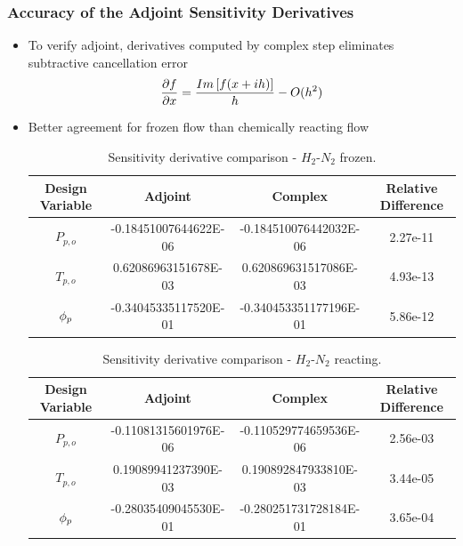 \documentclass{beamer}
\begin{document}
\begin{frame}
  \frametitle{Accuracy of the Adjoint Sensitivity Derivatives}
  \begin{itemize}
    \item To verify adjoint, derivatives computed by complex step eliminates
      subtractive cancellation error
    \[
      \frac{\partial f}{\partial x} = \frac{Im\left[ f(x + ih) \right]}{h} - O(h^2)
    \]
    \item Better agreement for frozen flow than chemically reacting flow
\begin{table}[h] 
  \tiny
  \centering 
  \begin{tabular}{c|c|c|c} 
    Design Variable & Adjoint & Complex & Relative Difference\\
    \hline 
    $P_{p,o}$ & -0.18451007644622E-06 & -0.184510076442032E-06 & 2.27e-11 \\ 
    $T_{p,o}$ &  0.62086963151678E-03 &  0.620869631517086E-03 & 4.93e-13 \\ 
    $\phi_p$     & -0.34045335117520E-01 & -0.340453351177196E-01 & 5.86e-12 
  \end{tabular}
  \caption{Sensitivity derivative comparison - $H_2$-$N_2$ frozen.}
  \label{tab:frozen-deriv-check}
\end{table}
\begin{table}[h]
  \centering
  \tiny
  \begin{tabular}{c|c|c|c}
    Design Variable & Adjoint & Complex & Relative Difference\\
    \hline
    $P_{p,o}$ & -0.11081315601976E-06 & -0.110529774659536E-06 & 2.56e-03 \\
    $T_{p,o}$ &  0.19089941237390E-03 &  0.190892847933810E-03 & 3.44e-05 \\
    $\phi_p$     & -0.28035409045530E-01 & -0.280251731728184E-01 & 3.65e-04
  \end{tabular}
  \caption{Sensitivity derivative comparison - $H_2$-$N_2$ reacting.}
  \label{tab:react-deriv-check}
\end{table}
  \end{itemize}
\end{frame}
\end{document}
